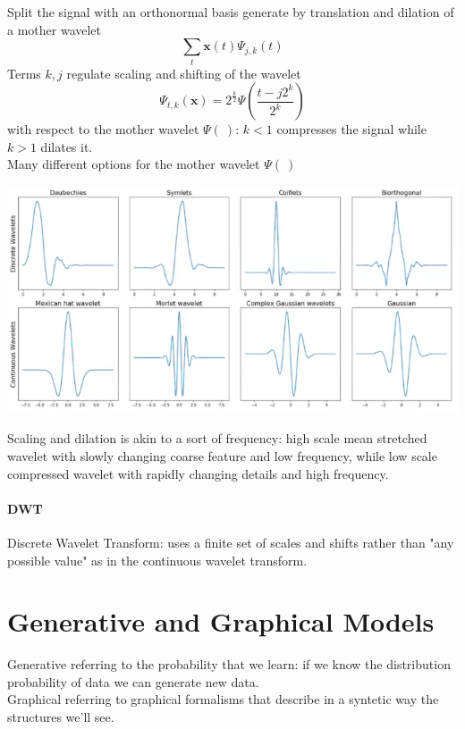 \documentclass[10pt]{report}
\begin{document}
Split the signal with an orthonormal basis generate by translation and dilation of a mother wavelet $$\sum_t \mathbf{x}(t)\Psi_{j,k}(t)$$
Terms $k,j$ regulate scaling and shifting of the wavelet
$$\Psi_{t,k}(\mathbf{x}) = 2^{\frac{k}{2}}\Psi\left(\frac{t-j2^k}{2^k}\right)$$
with respect to the mother wavelet $\Psi(\:)$: $k<1$ compresses the signal while $k>1$ dilates it.\\
Many different options for the mother wavelet $\Psi(\:)$
\begin{center}
	\includegraphics[scale=0.5]{13.png}
\end{center}
Scaling and dilation is akin to a sort of frequency: high scale mean stretched wavelet with slowly changing coarse feature and low frequency, while low scale compressed wavelet with rapidly changing details and high frequency.
\paragraph{DWT} Discrete Wavelet Transform: uses a finite set of scales and shifts rather than "any possible value" as in the continuous wavelet transform.

\section{Generative and Graphical Models}
Generative referring to the probability that we learn: if we know the distribution probability of data we can generate new data.\\
Graphical referring to graphical formalisms that describe in a syntetic way the structures we'll see.
\end{document}
